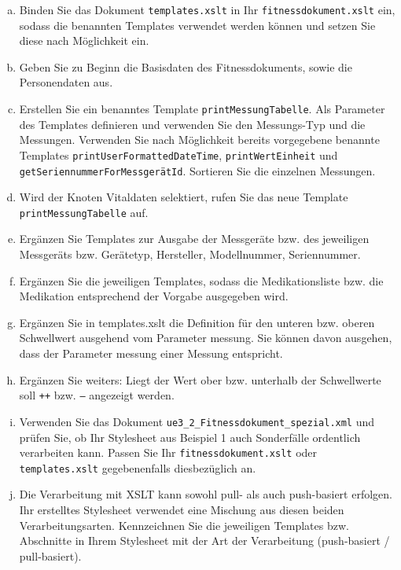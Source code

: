 \documentclass[a4paper,11pt]{report}
\begin{document}
\begin{enumerate}[a.]

    \item Binden Sie das Dokument \texttt{templates.xslt} in Ihr \texttt{fitnessdokument.xslt} ein, sodass die
    benannten Templates verwendet werden können und setzen Sie diese nach Möglichkeit ein.

    \item Geben Sie zu Beginn die Basisdaten des Fitnessdokuments, sowie die Personendaten aus.
    
    \item Erstellen Sie ein benanntes Template \texttt{printMessungTabelle}. 
    Als Parameter des Templates definieren und verwenden Sie den Messungs-Typ und die Messungen. 
    Verwenden Sie nach Möglichkeit bereits vorgegebene benannte Templates \texttt{printUserFormattedDateTime},
    \texttt{printWertEinheit} und \texttt{getSeriennummerForMessgerätId}. 
    Sortieren Sie die einzelnen Messungen.

    \item Wird der Knoten Vitaldaten selektiert, rufen Sie das neue Template \texttt{printMessungTabelle} auf.

    \item Ergänzen Sie Templates zur Ausgabe der Messgeräte bzw. des jeweiligen Messgeräts bzw. Gerätetyp, Hersteller, Modellnummer, Seriennummer.
    
    \item Ergänzen Sie die jeweiligen Templates, sodass die Medikationsliste bzw. die Medikation entsprechend der Vorgabe ausgegeben wird.
    \item Ergänzen Sie in templates.xslt die Definition für den unteren bzw. oberen Schwellwert ausgehend vom Parameter messung. 
    Sie können davon ausgehen, dass der Parameter messung einer Messung entspricht.
    \item Ergänzen Sie weiters: Liegt der Wert ober bzw. unterhalb der Schwellwerte soll \texttt{++} bzw. \texttt{--} angezeigt werden.
    \item Verwenden Sie das Dokument \texttt{ue3\_2\_Fitnessdokument\_spezial.xml} und prüfen Sie, ob Ihr Stylesheet aus Beispiel 1 auch Sonderfälle ordentlich verarbeiten kann. 
    Passen Sie Ihr \texttt{fitnessdokument.xslt} oder \texttt{templates.xslt} gegebenenfalls diesbezüglich an.
    \item Die Verarbeitung mit XSLT kann sowohl pull- als auch push-basiert erfolgen. 
    Ihr erstelltes Stylesheet verwendet eine Mischung aus diesen beiden Verarbeitungsarten. 
    Kennzeichnen Sie die jeweiligen Templates bzw. Abschnitte in Ihrem Stylesheet mit der Art der Verarbeitung (push-basiert / pull-basiert).
\end{enumerate}
\end{document}
